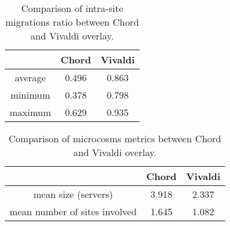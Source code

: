\begin{table}

  \begin{center}
    \begin{tabular}{|c|c|c|}   

      \hline \multicolumn{1}{|p{3cm}|}{ }
       & \multicolumn{1}{|p{3cm}|}{\centering Chord }  & \multicolumn{1}{|p{3cm}|}{ \centering Vivaldi}  \\

      \hline
      average & 0.496 & 0.863 \\

      \hline
      minimum & 0.378 & 0.798 \\

      \hline
      maximum & 0.629 & 0.935 \\

      \hline
    \end{tabular}
  \end{center}
  \caption{Comparison of intra-site migrations ratio between Chord and Vivaldi overlay.}
\end{table}


\begin{table}

  \begin{center}
    \begin{tabular}{|c|c|c|}   

      \hline \multicolumn{1}{|p{3cm}|}{ }
       & \multicolumn{1}{|p{3cm}|}{\centering Chord }  & \multicolumn{1}{|p{3cm}|}{ \centering Vivaldi}  \\

      \hline
      mean size (servers) & 3.918 & 2.337 \\

      \hline
      mean number of sites involved & 1.645 & 1.082 \\

      \hline
    \end{tabular}
  \end{center}
  \caption{Comparison of microcosms metrics between Chord and Vivaldi overlay.}
\end{table}
